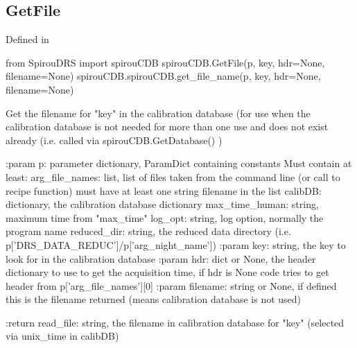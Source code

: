 \begin{minipage}{\textwidth}
\subsection{GetFile}

Defined in \spirouCDB{}

\begin{pythonbox}
from SpirouDRS import spirouCDB
spirouCDB.GetFile(p, key, hdr=None, filename=None)
spirouCDB.spirouCDB.get_file_name(p, key, hdr=None, filename=None)
\end{pythonbox}

\begin{pythondocstring}
Get the filename for "key" in the calibration database (for use when
the calibration database is not needed for more than one use and does
not exist already (i.e. called via spirouCDB.GetDatabase() )

:param p: parameter dictionary, ParamDict containing constants
    Must contain at least:
            arg_file_names: list, list of files taken from the command line
                            (or call to recipe function) must have at least
                            one string filename in the list
            calibDB: dictionary, the calibration database dictionary
            max_time_human: string, maximum time from "max_time"
            log_opt: string, log option, normally the program name
            reduced_dir: string, the reduced data directory
                         (i.e. p['DRS_DATA_REDUC']/p['arg_night_name'])
:param key: string, the key to look for in the calibration database
:param hdr: dict or None, the header dictionary to use to get the
            acquisition time, if hdr is None code tries to get
            header from p['arg_file_names'][0]
:param filename: string or None, if defined this is the filename returned
                 (means calibration database is not used)

:return read_file: string, the filename in calibration database for
                   "key" (selected via unix_time in calibDB)
\end{pythondocstring}
\end{minipage}

